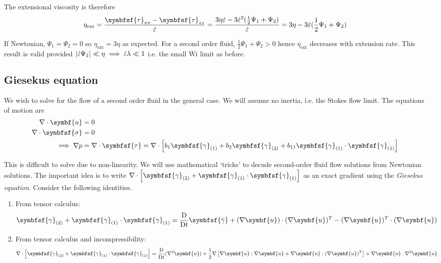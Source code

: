 \documentclass{jknotes}
\newcommand{\nsrate}[1]{\symbfsf{\gamma}_{(#1)}}
\begin{document}
The extensional viscosity is therefore
\begin{equation}
	\eta_{\text{ext}} = \frac{\symbfsf{\tau}_{xx} -
		\symbfsf{\tau}_{zz}}{\dot{\vare}} = \frac{3 \eta \dot{\vare} - 3
		\dot{\vare}^2 (\frac{1}{2}\Psi_1 + \Psi_2)}{\dot{\vare}} = 3\eta - 3
		\dot{\vare} (\frac{1}{2}\Psi_1 + \Psi_2)
\end{equation}

If Newtonian, $\Psi_1 = \Psi_2 = 0$ so $\eta_{\text{ext}} = 3\eta$ as
expected. For a second order fluid, $\frac{1}{2}\Psi_1 + \Psi_2 > 0$ hence
$\eta_{\text{ext}}$ decreases with extension rate. This result is valid
provided $\abs{\dot{\varepsilon} \Psi_1} \ll \eta \implies \dot{\varepsilon} \lambda \ll
1$ i.e. the small $\text{Wi}$ limit as before.

\subsection{Giesekus equation}
We wish to solve for the flow of a second order fluid in the general case. We
will assume no inertia, i.e. the Stokes flow limit. The equations of motion
are
\begin{align}
	\nabla \cdot \symbf{u} &= 0  \\
	\nabla \cdot \symbfsf{\sigma} &= 0 \\
	\implies \nabla p &= \nabla \cdot \symbfsf{\tau} = \nabla \cdot \left[
		b_1\nsrate{1} + b_2 \nsrate{2} + b_{11}
	\nsrate{1}\cdot\nsrate{1}\right]
\end{align}

This is difficult to solve due to non-linearity. We will use mathematical
`tricks' to decude second-order fluid flow solutions from Newtonian solutions.
The important idea is to write $\nabla \cdot \left[ \nsrate{2} +
\nsrate{1}\cdot\nsrate{1}\right]$ as an exact gradient using the
\emph{Giesekus equation}. Consider the following identities.
\begin{enumerate}
	\item From tensor calculus: 
		\begin{equation}
			\nsrate{2} + \nsrate{1}\cdot\nsrate{1} = \frac{\diffD}{\diffD t}
			\symbfsf{\srate} + (\nabla \symbf{u})\cdot(\nabla \symbf{u})^T -
			(\nabla \symbf{u})^T \cdot (\nabla \symbf{u})
		\end{equation}
	\item From tensor calculus and incompressibility:
		\begin{equation}
			\nabla \cdot \left[ \nsrate{2} + \nsrate{1}\cdot\nsrate{1}\right]
			= \frac{\diffD}{\diffD t} (\nabla^2 \symbf{u}) +
			\frac{1}{2}\nabla\left[ \nabla \symbf{u}:\nabla\symbf{u} +
			\nabla\symbf{u}:(\nabla \symbf{u})^T\right] + \nabla
			\symbf{u}\cdot\nabla^2 \symbf{u}
		\end{equation}
\end{enumerate}
\end{document}
